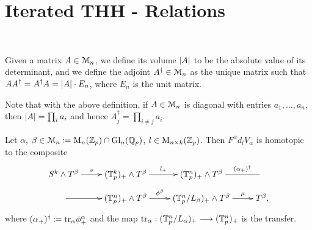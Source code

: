 \section{Iterated THH - Relations}
  \\
  \begin{defn}
    Given a matrix $A \in \mathcal{M}_n$, we define its volume $\left\vert A\right\vert$ to be the
    absolute value of its determinant, and we define the adjoint $A^\dagger \in
    \mathcal{M}_n$ as the unique matrix such that $A A^\dagger = A^\dagger A = \left\vert A\right\vert
    \cdot E_n$, where $E_n$ is the unit matrix.
  \end{defn}
  \begin{rem}
    Note that with the above definition, if $A \in \mathcal{M}_n$ is diagonal with
    entries $a_1, \ldots, a_n$, then $\left\vert A\right\vert = \prod_i a_i$ and hence
    $A^\dagger_j = \prod_{i \neq j} a_i$.
  \end{rem}
  \begin{lem}\cite[Lemma 3.17]{carlsson2011higher}
    Let $\alpha$, $\beta \in \mathcal{M}_n \coloneqq \mathrm{M}_n(\mathbb{Z}_p) \cap \operatorname{Gl}_n(\mathbb{Q}_p)$, $l \in
    \mathrm{M}_{n \times k}(\mathbb{Z}_p)$. Then $F^\alpha d_l V_\alpha$ is homotopic to the
    composite
    \begin{displaymath}
      \xymatrix@R-=1em{
        S^k \wedge T^\beta \ar[r]^-{\sigma} &%
        (\sT^k_p)_+ \wedge T^\beta \ar[r]^-{l_+} &%
        (\sT^n_p)_+ \wedge T^\beta \ar@{-}[r]^-{(\alpha_+)^\dagger} &%
        \\
        \ar[r] &
        (\sT^n_p)_+ \wedge T^\beta \ar[r]^-{\phi^\beta} &%
        (\sT^n_p/L_\beta)_+ \wedge T^\beta \ar[r]^-{\mu} &%
        T^\beta,
      }%
    \end{displaymath}
    where $(\alpha_+)^\dagger \coloneqq \mathrm{tr}_\alpha\phi^\alpha_+$ and the map
    $\mathrm{tr}_\alpha: (\mathbb{T}^n_p/L_\alpha)_+ \longrightarrow (\mathbb{T}^n_p)_+$ is the transfer.
  \end{lem}
